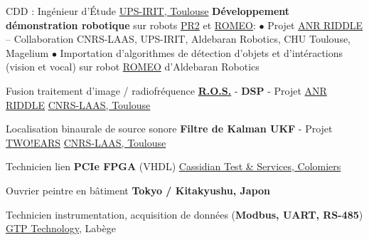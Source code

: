 \documentclass[
	a4paper,
	subsectioncolor=cvblue!70,
]{fortysecondscv}
\newcommand{\ros}{\href{http://www.ros.org/}{R.O.S.}}
\begin{document}
\begin{cvtable}[2]
  {CDD : Ingénieur d'Étude}
  {\href{https://www.irit.fr/?lang=fr}{UPS-IRIT, Toulouse}}
  {
    \textbf{Développement démonstration robotique} sur robots
    \href{http://www.willowgarage.com/pages/pr2/overview}{PR2} et
    \href{https://spectrum.ieee.org/automaton/robotics/humanoids/aldebaran-robotics-introduces-romeo-finally}{ROMEO}:\newline
    $\bullet$ Projet
    \href{http://www.agence-nationale-recherche.fr/Project-ANR-12-CORD-0003}{ANR
      RIDDLE} -- Collaboration CNRS-LAAS, UPS-IRIT, Aldebaran Robotics, CHU
    Toulouse, Magelium\newline
    $\bullet$ Importation d'algorithmes de détection d'objets et d'intéractions (vision
    et vocal) sur robot \href{https://spectrum.ieee.org/automaton/robotics/humanoids/aldebaran-robotics-introduces-romeo-finally}{ROMEO}
    d'Aldebaran Robotics
  }
\end{cvtable}

\begin{cvtable}[2]
  {
    Fusion traitement d'image / radiofréquence\newline
    \textbf{\ros} - \textbf{DSP} - Projet
    \href{http://www.agence-nationale-recherche.fr/Project-ANR-12-CORD-0003}{ANR
      RIDDLE}
  }
  {\href{https://www.laas.fr/public/fr}{CNRS-LAAS, Toulouse}}
  {}

  {
    Localisation binaurale de source sonore\newline
    \textbf{Filtre de Kalman UKF} - Projet \href{http://twoears.eu/}{TWO!EARS}
  }
  {\href{https://www.laas.fr/public/fr}{CNRS-LAAS, Toulouse}}
  {}

  {Technicien lien \textbf{PCIe FPGA} (VHDL)}
  {\href{http://www.spherea.com/fr}{Cassidian Test \& Services, Colomiers}}
  {}

  {Ouvrier peintre en bâtiment}
  {\textbf{Tokyo / Kitakyushu, Japon}}
  {}

  {Technicien instrumentation, acquisition de données (\textbf{Modbus, UART, RS-485})}
  {\href{https://www.gtptech.com/}{GTP Technology}, Labège}
  {}
\end{cvtable}



\cvsignature
\end{document}

